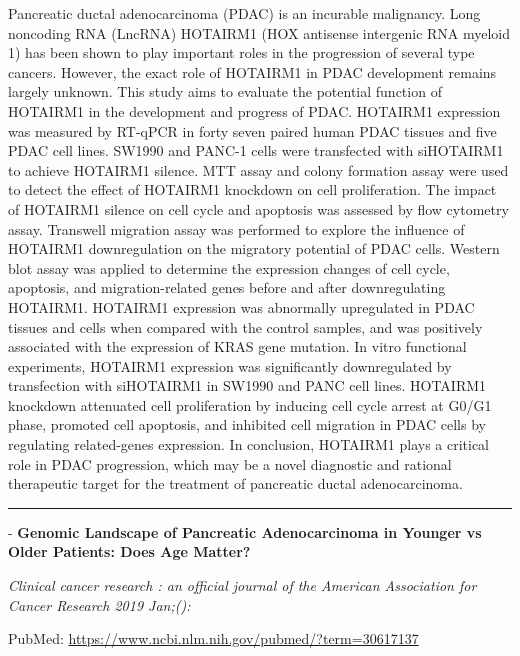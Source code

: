 \documentclass[]{article}
\begin{document}
Pancreatic ductal adenocarcinoma (PDAC) is an incurable malignancy. Long
noncoding RNA (LncRNA) HOTAIRM1 (HOX antisense intergenic RNA myeloid 1)
has been shown to play important roles in the progression of several
type cancers. However, the exact role of HOTAIRM1 in PDAC development
remains largely unknown. This study aims to evaluate the potential
function of HOTAIRM1 in the development and progress of PDAC. HOTAIRM1
expression was measured by RT-qPCR in forty seven paired human PDAC
tissues and five PDAC cell lines. SW1990 and PANC-1 cells were
transfected with siHOTAIRM1 to achieve HOTAIRM1 silence. MTT assay and
colony formation assay were used to detect the effect of HOTAIRM1
knockdown on cell proliferation. The impact of HOTAIRM1 silence on cell
cycle and apoptosis was assessed by flow cytometry assay. Transwell
migration assay was performed to explore the influence of HOTAIRM1
downregulation on the migratory potential of PDAC cells. Western blot
assay was applied to determine the expression changes of cell cycle,
apoptosis, and migration-related genes before and after downregulating
HOTAIRM1. HOTAIRM1 expression was abnormally upregulated in PDAC tissues
and cells when compared with the control samples, and was positively
associated with the expression of KRAS gene mutation. In vitro
functional experiments, HOTAIRM1 expression was significantly
downregulated by transfection with siHOTAIRM1 in SW1990 and PANC cell
lines. HOTAIRM1 knockdown attenuated cell proliferation by inducing cell
cycle arrest at G0/G1 phase, promoted cell apoptosis, and inhibited cell
migration in PDAC cells by regulating related-genes expression. In
conclusion, HOTAIRM1 plays a critical role in PDAC progression, which
may be a novel diagnostic and rational therapeutic target for the
treatment of pancreatic ductal adenocarcinoma.

{}

{}

\begin{center}\rule{0.5\linewidth}{\linethickness}\end{center}

 - \textbf{Genomic Landscape of Pancreatic Adenocarcinoma in Younger vs
Older Patients: Does Age Matter?}

\emph{Clinical cancer research : an official journal of the American
Association for Cancer Research 2019 Jan;():}

PubMed: \url{https://www.ncbi.nlm.nih.gov/pubmed/?term=30617137}
\end{document}
